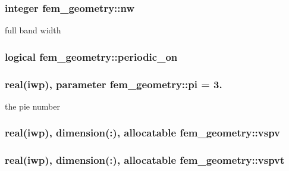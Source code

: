 \hypertarget{classfem__geometry_a3210309ce3a4780b35fc7177624fd346}{}
\subsubsection[{nw}]{\setlength{\rightskip}{0pt plus 5cm}integer fem\+\_\+geometry\+::nw}\label{classfem__geometry_a3210309ce3a4780b35fc7177624fd346}


full band width 

\hypertarget{classfem__geometry_adf6e7f772d4353d9f16819ddd6d4dd37}{}
\subsubsection[{periodic\+\_\+on}]{\setlength{\rightskip}{0pt plus 5cm}logical fem\+\_\+geometry\+::periodic\+\_\+on}\label{classfem__geometry_adf6e7f772d4353d9f16819ddd6d4dd37}
\hypertarget{classfem__geometry_ae0111b7a7d03ad788204159aab5ad643}{}
\subsubsection[{pi}]{\setlength{\rightskip}{0pt plus 5cm}real(iwp), parameter fem\+\_\+geometry\+::pi = 3.}\label{classfem__geometry_ae0111b7a7d03ad788204159aab5ad643}


the pie number 

\hypertarget{classfem__geometry_a4f9dbcb2e6ba0f44baca0b6097aecbf3}{}
\subsubsection[{vspv}]{\setlength{\rightskip}{0pt plus 5cm}real(iwp), dimension(\+:), allocatable fem\+\_\+geometry\+::vspv}\label{classfem__geometry_a4f9dbcb2e6ba0f44baca0b6097aecbf3}
\hypertarget{classfem__geometry_a549800c8fc00402740941a8af20e7484}{}
\subsubsection[{vspvt}]{\setlength{\rightskip}{0pt plus 5cm}real(iwp), dimension(\+:), allocatable fem\+\_\+geometry\+::vspvt}\label{classfem__geometry_a549800c8fc00402740941a8af20e7484}


